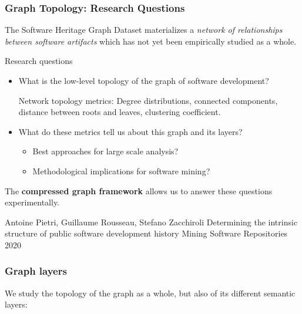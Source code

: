 \documentclass[aspectratio=169,xcolor=table]{beamer}
\begin{document}
    \begin{frame}
        \frametitle{Graph Topology: Research Questions}

        \begin{block}{}
            The Software Heritage Graph Dataset materializes a \emph{network of
            relationships between software artifacts} which has not yet been
            empirically studied as a whole.
        \end{block}

        \begin{block}{Research questions}

            \begin{itemize}
                \item What is the low-level topology of the graph of software
                    development?

                    Network topology metrics: Degree distributions, connected
                    components, distance between roots and leaves, clustering
                    coefficient.

                \item What do these metrics tell us about this graph and its
                    layers?
                    \begin{itemize}
                \item Best approaches for large scale analysis?
                \item Methodological implications for software mining?
                    \end{itemize}
            \end{itemize}

            The \textbf{compressed graph framework} allows us to answer these
            questions experimentally.

            \footnotesize
            \begin{thebibliography}{swhforks}
                 Antoine Pietri, Guillaume Rousseau, Stefano Zacchiroli\newblock
                Determining the intrinsic structure of public software development history\newblock
                Mining Software Repositories 2020\newblock
            \end{thebibliography}
        \end{block}
    \end{frame}

    \begin{frame}
        \frametitle{Graph layers}

        \begin{block}{}
            We study the topology of the graph as a whole, but also of its
            different semantic layers:
        \end{block}

        \begin{center}
            \scalebox{0.6}{}
        \end{center}
    \end{frame}
\end{document}
